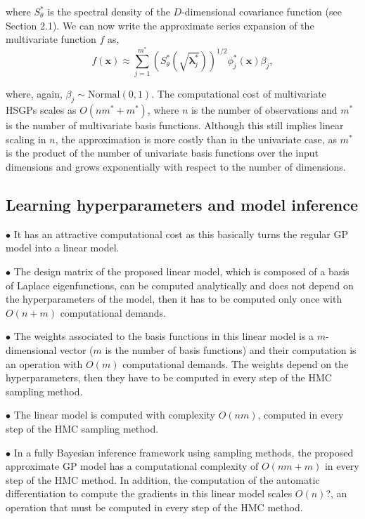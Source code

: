\documentclass[]{interact}
\theoremstyle{plain}%
\theoremstyle{definition}
\theoremstyle{remark}
\begin{document}
\noindent where $S^{\ast}_{\theta}$ is the spectral density of the $D$-dimensional covariance function (see Section 2.1). We can now write the approximate series expansion of the multivariate function $f$ as,
%
\begin{equation}\label{approxf_multi}
f(\mathbf{x}) \approx \sum_{j=1}^{m^{\ast}} 
\left( S^{\ast}_{\theta} \left(\sqrt{\boldsymbol{\lambda}^{\ast}_j} \right)\right)^{1/2}
\phi^{\ast}_j(\mathbf{x}) \beta_j, 
\end{equation}

\noindent where, again, $\beta_j \sim \text{Normal}(0,1)$. The computational cost of multivariate HSGPs scales as $O(n m^{\ast} + m^{\ast})$, where $n$ is the number of observations and $m^{\ast}$ is the number of multivariate basis functions. Although this still implies linear scaling in $n$, the approximation is more costly than in the univariate case, as $m^{\ast}$ is the product of the number of univariate basis functions over the input dimensions and grows exponentially with respect to the number of  dimensions.

\subsection{Learning hyperparameters and model inference}

\vspace{2mm}
$\bullet$ It has an attractive computational cost as this basically turns the regular GP model into a linear model.

\vspace{2mm}
$\bullet$ The design matrix of the proposed linear model, which is composed of a basis of Laplace eigenfunctions, can be computed analytically and does not depend on the hyperparameters of the model, then it has to be computed only once with $O(n+m)$ computational demands.

\vspace{2mm}
$\bullet$ The weights associated to the basis functions in this linear model is a $m$-dimensional vector ($m$ is the number of basis functions) and their computation is an operation with $O(m)$ computational demands. The weights depend on the hyperparameters, then they have to be computed in every step of the HMC sampling method.

\vspace{2mm}
$\bullet$ The linear model is computed with complexity $O(nm)$, computed in every step of the HMC sampling method.

\vspace{2mm}
$\bullet$ In a fully Bayesian inference framework using sampling methods, the proposed approximate GP model has a computational complexity of $O(nm+m)$ in every step of the HMC method. In addition, the computation of the automatic differentiation to compute the gradients in this linear model scales $O(n)$?, an operation that must be computed in every step of the HMC method.
\end{document}
